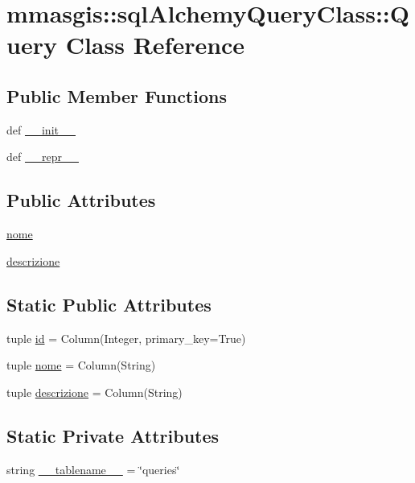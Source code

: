 \hypertarget{classmmasgis_1_1sqlAlchemyQueryClass_1_1Query}{
\section{mmasgis::sqlAlchemyQueryClass::Query Class Reference}
\label{classmmasgis_1_1sqlAlchemyQueryClass_1_1Query}
}
\subsection*{Public Member Functions}
\begin{DoxyCompactItemize}
\item 
def \hyperlink{classmmasgis_1_1sqlAlchemyQueryClass_1_1Query_ae5a3b0fc84237f397abf84461c898244}{\_\-\_\-init\_\-\_\-}
\item 
def \hyperlink{classmmasgis_1_1sqlAlchemyQueryClass_1_1Query_a5ae9310858996e6608f3e7a31beffb44}{\_\-\_\-repr\_\-\_\-}
\end{DoxyCompactItemize}
\subsection*{Public Attributes}
\begin{DoxyCompactItemize}
\item 
\hyperlink{classmmasgis_1_1sqlAlchemyQueryClass_1_1Query_a77270f7bc4290a3d7e275be57b8d881c}{nome}
\item 
\hyperlink{classmmasgis_1_1sqlAlchemyQueryClass_1_1Query_a0dd8969b2d576ff1004c023c60ba51eb}{descrizione}
\end{DoxyCompactItemize}
\subsection*{Static Public Attributes}
\begin{DoxyCompactItemize}
\item 
tuple \hyperlink{classmmasgis_1_1sqlAlchemyQueryClass_1_1Query_a31cc61f142d0c3ba99d7131f62a78093}{id} = Column(Integer, primary\_\-key=True)
\item 
tuple \hyperlink{classmmasgis_1_1sqlAlchemyQueryClass_1_1Query_a8d370993a7711c873c42f7580ef8ce68}{nome} = Column(String)
\item 
tuple \hyperlink{classmmasgis_1_1sqlAlchemyQueryClass_1_1Query_a33a0c6cba2e5bda2152310b3dbb3816c}{descrizione} = Column(String)
\end{DoxyCompactItemize}
\subsection*{Static Private Attributes}
\begin{DoxyCompactItemize}
\item 
string \hyperlink{classmmasgis_1_1sqlAlchemyQueryClass_1_1Query_a04cb6a3f5615d2bf83b6209679571edf}{\_\-\_\-tablename\_\-\_\-} = \char`\"{}queries\char`\"{}
\end{DoxyCompactItemize}



